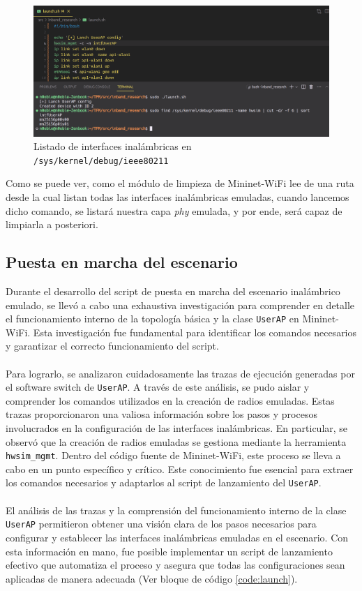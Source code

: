 \begin{figure}[ht!]
    \centering
    \includegraphics[width=\textwidth]{archivos/img/analisis/debugBOFUSS_1.png}
    \caption{Listado de interfaces inalámbricas en \texttt{/sys/kernel/debug/ieee80211}}
    \label{fig:debugBOFUSS_1}
\end{figure}


Como se puede ver,  como el módulo de limpieza de Mininet-WiFi lee de una ruta desde la cual listan todas las interfaces inalámbricas emuladas, cuando lancemos dicho comando, se listará nuestra capa \textit{phy} emulada, y por ende, será capaz de limpiarla a posteriori.


\subsection{Puesta en marcha del escenario}

Durante el desarrollo del script de puesta en marcha del escenario inalámbrico emulado, se llevó a cabo una exhaustiva investigación para comprender en detalle el funcionamiento interno de la topología básica y la clase \texttt{UserAP} en Mininet-WiFi. Esta investigación fue fundamental para identificar los comandos necesarios y garantizar el correcto funcionamiento del script.\\
\\
Para lograrlo, se analizaron cuidadosamente las trazas de ejecución generadas por el software switch de \texttt{UserAP}. A través de este análisis, se pudo aislar y comprender los comandos utilizados en la creación de radios emuladas. Estas trazas proporcionaron una valiosa información sobre los pasos y procesos involucrados en la configuración de las interfaces inalámbricas. En particular, se observó que la creación de radios emuladas se gestiona mediante la herramienta \texttt{hwsim\_mgmt}. Dentro del código fuente de Mininet-WiFi, este proceso se lleva a cabo en un punto específico y crítico. Este conocimiento fue esencial para extraer los comandos necesarios y adaptarlos al script de lanzamiento del \texttt{UserAP}.\\
\\
El análisis de las trazas y la comprensión del funcionamiento interno de la clase \texttt{UserAP} permitieron obtener una visión clara de los pasos necesarios para configurar y establecer las interfaces inalámbricas emuladas en el escenario. Con esta información en mano, fue posible implementar un script de lanzamiento efectivo que automatiza el proceso y asegura que todas las configuraciones sean aplicadas de manera adecuada (Ver bloque de código \ref{code:launch}).\\

